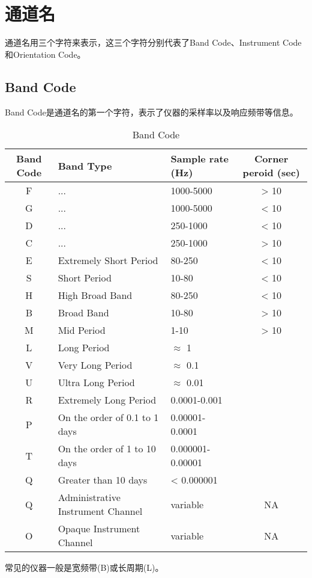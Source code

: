 \section{通道名}
通道名用三个字符来表示，这三个字符分别代表了Band Code、Instrument Code和Orientation Code。

\subsection{Band Code}
Band Code是通道名的第一个字符，表示了仪器的采样率以及响应频带等信息。

\begin{table}[H]
\centering
\caption{Band Code}
\begin{tabular}{cllc}
\toprule
Band Code   &   Band Type   &   Sample rate (Hz)    & Corner peroid (sec)   \\
\midrule
F           &   ...         &   1000-5000   &     > 10    \\
G           &   ...         &   1000-5000   &     < 10    \\
D           &   ...         &   250-1000    &     < 10    \\
C           &   ...         &   250-1000    &     > 10    \\
E           &   Extremely Short Period  & 80-250    &     < 10    \\
S           &   Short Period          & 10-80   & < 10    \\
H           &   High Broad Band         &   80-250    &   < 10    \\
B           &   Broad Band          &   10-80   & > 10    \\
M           &   Mid Period          &   1-10   & > 10    \\
L           &   Long Period         &   $\approx$ 1   &   \\
V           &   Very  Long Period         & $\approx$ 0.1   &   \\
U           &   Ultra Long Period         & $\approx$ 0.01    &   \\
R           &   Extremely Long Period     & 0.0001-0.001    &   \\
P           &   On the order of 0.1 to 1 days   & 0.00001-0.0001    &   \\
T           &   On the order of 1 to 10 days    & 0.000001-0.00001    &   \\
Q           &   Greater than 10 days          &     < 0.000001    &   \\
Q           &   Administrative Instrument Channel   & variable    & NA    \\
O           &   Opaque Instrument Channel         & variable    &   NA    \\
\bottomrule
\end{tabular}
\end{table}
常见的仪器一般是宽频带(B)或长周期(L)。

